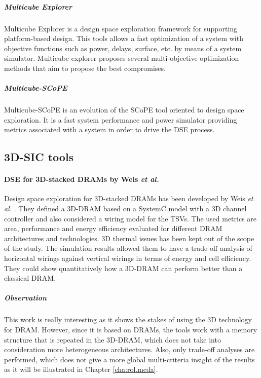 \subparagraph{Multicube Explorer}

Multicube Explorer \cite{m3explorer09} is a design space exploration framework for supporting platform-based design. This tools allows a fast optimization of a system with objective functions such as power, delays, surface, etc. by means of a system simulator. Multicube explorer proposes several multi-objective optimization methods that aim to propose the best compromises.

\subparagraph{Multicube-SCoPE}

Multicube-SCoPE \cite{m3scope09} is an evolution of the SCoPE tool \cite{scope04} oriented to design space exploration. It is a fast system performance and power simulator providing metrics associated with a system in order to drive the DSE process.

\subsection{3D-SIC tools}

\paragraph{DSE for 3D-stacked DRAMs by Weis \textit{et al.}}
Design space exploration for 3D-stacked DRAMs has been developed by Weis \textit{et al.} \cite{5763068}. They defined a 3D-DRAM based on a SystemC model with a 3D channel controller and also considered a wiring model for the TSVs. The used metrics are area, performance and energy efficiency evaluated for different DRAM architectures and technologies. 3D thermal issues has been kept out of the scope of the study. The simulation results allowed them to have a trade-off analysis of horizontal wirings against vertical wirings in terms of energy and cell efficiency. They could show quantitatively how a 3D-DRAM can perform better than a classical DRAM.

\subparagraph{Observation}
This work is really interesting as it shows the stakes of using the 3D technology for DRAM. However, since it is based on DRAMs, the tools work with a memory structure that is repeated in the 3D-DRAM, which does not take into consideration more heterogeneous architectures. Also, only trade-off analyses are performed, which does not give a more global multi-criteria insight of the results as it will be illustrated in Chapter \ref{cha:rol.mcda}.

